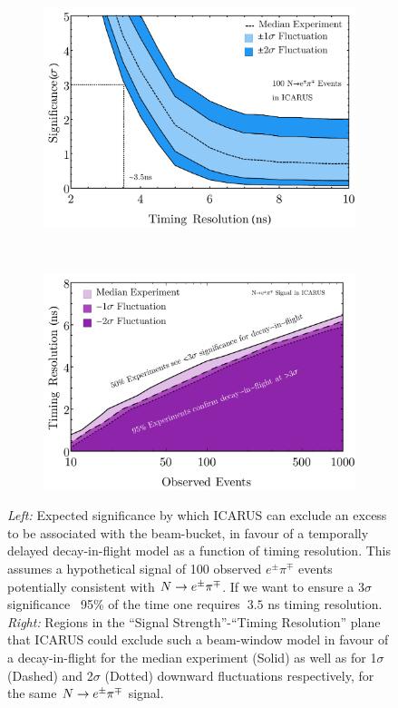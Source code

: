 \documentclass[11pt, a4paper]{article}
\def\ster{\ensuremath N}
\begin{document}
\begin{figure}[t]
\center
\begin{subfigure}[t]{0.5\textwidth}
\includegraphics[width=\textwidth]{figures/hockey_plot.pdf}
\end{subfigure}%
~
\begin{subfigure}[t]{0.5\textwidth}
\includegraphics[width=\textwidth]{figures/icarus_contour.pdf}
\end{subfigure}
\caption{\label{fig:hockey}
\emph{Left:} Expected significance by which ICARUS can exclude an excess to be associated with the beam-bucket, in favour of a temporally delayed decay-in-flight model as a function of timing resolution. This assumes a hypothetical signal of 100 observed $e^\pm \pi^\mp$ events potentially consistent with $\ster \rightarrow e^\pm \pi^\mp$. If we want to ensure a $3\sigma$ significance ~95\% of the time one requires $~3.5$ ns timing resolution. \emph{Right:} Regions in the ``Signal Strength''-``Timing Resolution'' plane that ICARUS could exclude such a beam-window model in favour of a decay-in-flight for the median experiment (Solid) as well as for 1$\sigma$ (Dashed) and 2$\sigma$ (Dotted) downward fluctuations respectively, for the same $\ster \rightarrow e^\pm \pi^\mp$ signal.}

\end{figure}
\end{document}
